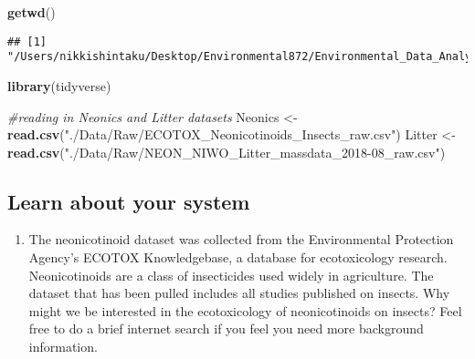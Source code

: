 \documentclass[]{article}
\newenvironment{Shaded}{\begin{snugshade}}{\end{snugshade}}
\newcommand{\CommentTok}[1]{\textcolor[rgb]{0.56,0.35,0.01}{\textit{#1}}}
\newcommand{\DataTypeTok}[1]{\textcolor[rgb]{0.13,0.29,0.53}{#1}}
\newcommand{\KeywordTok}[1]{\textcolor[rgb]{0.13,0.29,0.53}{\textbf{#1}}}
\newcommand{\NormalTok}[1]{#1}
\newcommand{\OperatorTok}[1]{\textcolor[rgb]{0.81,0.36,0.00}{\textbf{#1}}}
\newcommand{\StringTok}[1]{\textcolor[rgb]{0.31,0.60,0.02}{#1}}
\providecommand{\tightlist}{%
  \setlength{\itemsep}{0pt}\setlength{\parskip}{0pt}}
\begin{document}
\begin{Shaded}
\begin{Highlighting}[]
\KeywordTok{getwd}\NormalTok{()}
\end{Highlighting}
\end{Shaded}

\begin{verbatim}
## [1] "/Users/nikkishintaku/Desktop/Environmental872/Environmental_Data_Analytics_2020"
\end{verbatim}

\begin{Shaded}
\end{Shaded}

\begin{Shaded}
\begin{Highlighting}[]
\KeywordTok{library}\NormalTok{(tidyverse)}

\CommentTok{#reading in Neonics and Litter datasets }
\NormalTok{Neonics <-}\StringTok{ }\KeywordTok{read.csv}\NormalTok{(}\StringTok{"./Data/Raw/ECOTOX_Neonicotinoids_Insects_raw.csv"}\NormalTok{)}
\NormalTok{Litter <-}\StringTok{ }\KeywordTok{read.csv}\NormalTok{(}\StringTok{"./Data/Raw/NEON_NIWO_Litter_massdata_2018-08_raw.csv"}\NormalTok{)}
\end{Highlighting}
\end{Shaded}

\hypertarget{learn-about-your-system}{%
\subsection{Learn about your system}\label{learn-about-your-system}}

\begin{enumerate}
\def\labelenumi{\arabic{enumi}.}
\setcounter{enumi}{1}
\tightlist
\item
  The neonicotinoid dataset was collected from the Environmental
  Protection Agency's ECOTOX Knowledgebase, a database for ecotoxicology
  research. Neonicotinoids are a class of insecticides used widely in
  agriculture. The dataset that has been pulled includes all studies
  published on insects. Why might we be interested in the ecotoxicology
  of neonicotinoids on insects? Feel free to do a brief internet search
  if you feel you need more background information.
\end{enumerate}
\end{document}
